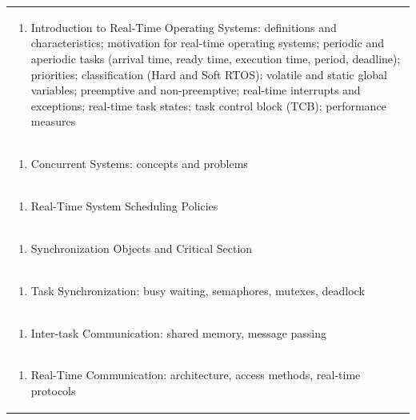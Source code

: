 \documentclass[11pt]{article}
\begin{document}
\begin{center}
\begin{longtable}{|p{4cm}|p{4cm}|p{4cm}|p{4cm}|}
\multicolumn{4}{|p{\dimexpr 16cm + 6\tabcolsep\relax}|}{\begin{enumerate}[start=2]\item Introduction to Real-Time Operating Systems: definitions and characteristics; motivation for real-time operating systems; periodic and aperiodic tasks (arrival time, ready time, execution time, period, deadline); priorities; classification (Hard and Soft RTOS); volatile and static global variables; preemptive and non-preemptive; real-time interrupts and exceptions; real-time task states; task control block (TCB); performance measures\end{enumerate}}\\
\multicolumn{4}{|p{\dimexpr 16cm + 6\tabcolsep\relax}|}{\begin{enumerate}[start=3]\item Concurrent Systems: concepts and problems\end{enumerate}}\\
\multicolumn{4}{|p{\dimexpr 16cm + 6\tabcolsep\relax}|}{\begin{enumerate}[start=4]\item Real-Time System Scheduling Policies\end{enumerate}}\\
\multicolumn{4}{|p{\dimexpr 16cm + 6\tabcolsep\relax}|}{\begin{enumerate}[start=5]\item Synchronization Objects and Critical Section\end{enumerate}}\\
\multicolumn{4}{|p{\dimexpr 16cm + 6\tabcolsep\relax}|}{\begin{enumerate}[start=6]\item Task Synchronization: busy waiting, semaphores, mutexes, deadlock\end{enumerate}}\\
\multicolumn{4}{|p{\dimexpr 16cm + 6\tabcolsep\relax}|}{\begin{enumerate}[start=7]\item Inter-task Communication: shared memory, message passing\end{enumerate}}\\
\multicolumn{4}{|p{\dimexpr 16cm + 6\tabcolsep\relax}|}{\begin{enumerate}[start=8]\item Real-Time Communication: architecture, access methods, real-time protocols\end{enumerate}}\\

\end{longtable}
\end{center}
\end{document}
